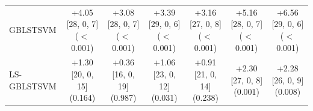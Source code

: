 \begin{table}[!t]
{\begin{tabular}{lcccccc}
GBLSTSVM & \shortstack{+4.05 [28, 0, 7]\\($<$0.001)} & \shortstack{+3.08 [28, 0, 7]\\($<$0.001)} & \shortstack{+3.39 [29, 0, 6]\\($<$0.001)} & \shortstack{+3.16 [27, 0, 8]\\($<$0.001)} & \shortstack{+5.16 [28, 0, 7]\\($<$0.001)} & \shortstack{+6.56 [29, 0, 6]\\($<$0.001)} \\[4pt]
LS-GBLSTSVM & \shortstack{+1.30 [20, 0, 15]\\(0.164)} & \shortstack{+0.36 [16, 0, 19]\\(0.987)} & \shortstack{+1.06 [23, 0, 12]\\(0.031)} & \shortstack{+0.91 [21, 0, 14]\\(0.238)} & \shortstack{+2.30 [27, 0, 8]\\(0.001)} & \shortstack{+2.28 [26, 0, 9]\\(0.008)} \\[4pt]
\bottomrule
\end{tabular}}
\end{table}
